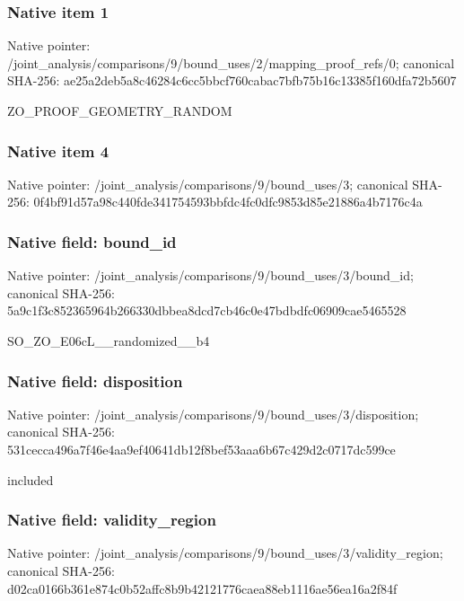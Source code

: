 \documentclass[10pt,a4paper]{article}
\begin{document}
\subsubsection{Native item 1}


Native pointer: /joint\_analysis/comparis\allowbreak{}ons/9/bound\_uses/2/mappi\allowbreak{}ng\_proof\_refs/0; canonical SHA-256: ae25a2deb5a8c46284c6cc5b\allowbreak{}bcf760cabac7bfb75b16c133\allowbreak{}85f160dfa72b5607


ZO\_PROOF\_GEOMETRY\_RANDOM


\subsubsection{Native item 4}


Native pointer: /joint\_analysis/comparis\allowbreak{}ons/9/bound\_uses/3; canonical SHA-256: 0f4bf91d57a98c440fde3417\allowbreak{}54593bbfdc4fc0dfc9853d85\allowbreak{}e21886a4b7176c4a



\subsubsection{Native field: bound\_id}


Native pointer: /joint\_analysis/comparis\allowbreak{}ons/9/bound\_uses/3/bound\allowbreak{}\_id; canonical SHA-256: 5a9c1f3c852365964b266330\allowbreak{}dbbea8dcd7cb46c0e47bdbdf\allowbreak{}c06909cae5465528


SO\_ZO\_E06cL\_\_randomized\_\_b4


\subsubsection{Native field: disposition}


Native pointer: /joint\_analysis/comparis\allowbreak{}ons/9/bound\_uses/3/dispo\allowbreak{}sition; canonical SHA-256: 531cecca496a7f46e4aa9ef4\allowbreak{}0641db12f8bef53aaa6b67c4\allowbreak{}29d2c0717dc599ce


included


\subsubsection{Native field: validity\_region}


Native pointer: /joint\_analysis/comparis\allowbreak{}ons/9/bound\_uses/3/valid\allowbreak{}ity\_region; canonical SHA-256: d02ca0166b361e874c0b52af\allowbreak{}fc8b9b42121776caea88eb11\allowbreak{}16ae56ea16a2f84f
\end{document}
